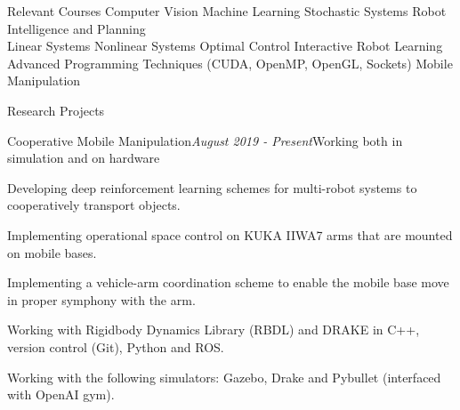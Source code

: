 \documentclass{resume} %
\begin{document}

\begin{rSection}{Relevant Courses}
Computer Vision  \hspace{20 pt} Machine Learning \hspace{26 pt} Stochastic Systems \hspace{10 pt}  Robot Intelligence and Planning
\\
Linear Systems \hspace{30 pt} Nonlinear Systems \hspace{20 pt} Optimal Control \hspace{22 pt} Interactive Robot Learning
\\
Advanced Programming Techniques ({\scriptsize CUDA, OpenMP, OpenGL, Sockets}) \hspace{10 pt} Mobile Manipulation


\end{rSection}


\begin{rSection}{Research Projects}

\begin{rSubsection}{Cooperative Mobile Manipulation}{\em August 2019 - Present}{Working both in simulation and on hardware}{}
\item Developing deep reinforcement learning schemes for multi-robot systems to cooperatively transport objects.
\item Implementing operational space control on KUKA IIWA7 arms that are mounted on mobile bases.
\item Implementing a vehicle-arm coordination scheme to enable the mobile base move in proper symphony with the arm.
\item Working with Rigidbody Dynamics Library (RBDL) and DRAKE in C++, version control (Git), Python and ROS.
\item Working with the following simulators: Gazebo, Drake and Pybullet (interfaced with OpenAI gym).
\end{rSubsection}

\end{rSection}
\end{document}

